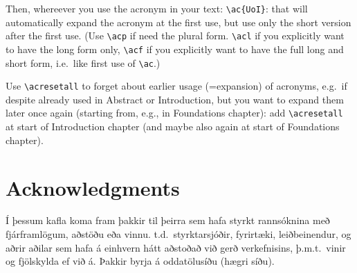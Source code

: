 \documentclass[a4paper,12pt,twoside,BCOR=10mm]{scrbook}
\begin{document}
Then, whereever you use the acronym in your text: \verb|\ac{UoI}|:
that will automatically expand the acronym at the first use, but use
only the short version after the first use.  (Use \verb|\acp| if need
the plural form. \verb|\acl| if you explicitly want to have the long
form only, \verb|\acf| if you explicitly want to have the full long
and short form, i.e.\ like first use of \verb|\ac|.)

Use \verb|\acresetall| to forget about earlier usage (=expansion) of
acronyms, e.g.\ if despite already used in Abstract or Introduction,
but you want to expand them later once again (starting from, e.g., in
Foundations chapter): add \verb|\acresetall| at start of Introduction
chapter (and maybe also again at start of Foundations chapter).

\chapter*{Acknowledgments}
Í þessum kafla koma fram þakkir til þeirra sem hafa styrkt rannsóknina með fjárframlögum, aðstöðu eða vinnu. t.d.\ styrktarsjóðir, fyrirtæki, leiðbeinendur, og aðrir aðilar sem hafa á einhvern hátt aðstoðað við gerð verkefnisins, þ.m.t.\ vinir og fjölskylda ef við á. Þakkir byrja á oddatölusíðu (hægri síðu).

\setcounter{page}{1}





\end{document}
